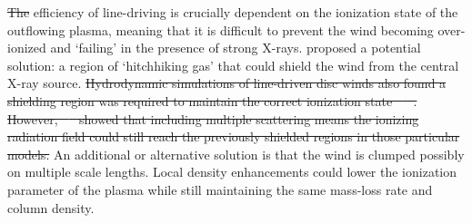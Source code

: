 \documentclass[preprint, a4paper, 11pt]{aastex}
\providecommand{\DIFadd}[1]{{\protect\color{blue}\uwave{#1}}} %
\providecommand{\DIFdel}[1]{{\protect\color{red}\sout{#1}}}                      %
\providecommand{\DIFaddbegin}{} %
\providecommand{\DIFaddend}{} %
\providecommand{\DIFdelbegin}{} %
\providecommand{\DIFdelend}{} %
\begin{document}
\DIFdel{The }\DIFdelend %
\DIFaddbegin \DIFadd{The }\DIFaddend efficiency of line-driving is crucially dependent on the ionization state 
of the outflowing plasma, meaning that it is difficult to prevent 
the wind becoming over-ionized and `failing' in the presence of strong X-rays. 
\cite{MCGV95} proposed a potential solution: 
a region of `hitchhiking gas' that could shield the wind from the central X-ray source. 
\DIFdelbegin \DIFdel{Hydrodynamic simulations of line-driven disc winds also found a shielding region
was required to maintain the correct ionization state \mbox{%
\citep{PSK2000,PK04}
}%
. 
However, \mbox{%
\cite{H14}
}%
showed that including multiple scattering means the ionizing radiation 
field could still reach the previously shielded regions in those particular models.
}\DIFdelend %
An additional or alternative solution is that the wind is clumped \citep[e.g.][]{hamann2013}
possibly on multiple scale lengths. Local density enhancements could lower the 
ionization parameter of the plasma while still maintaining the same mass-loss 
rate and column density. 
\end{document}
